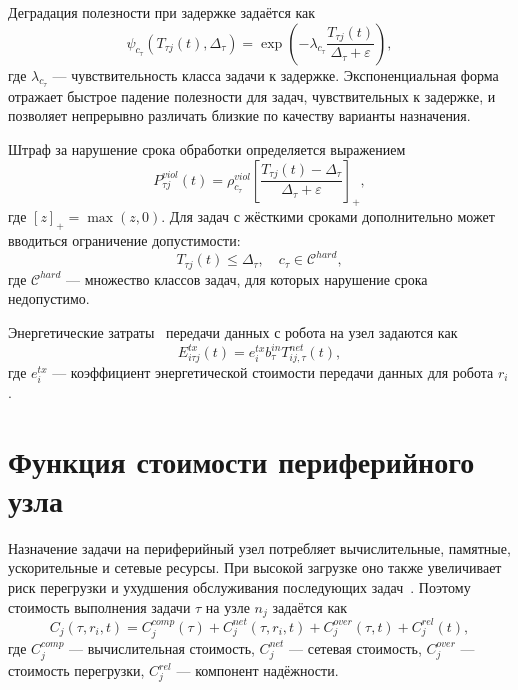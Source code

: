 Деградация полезности при задержке задаётся как
\begin{equation}
    \psi_{c_{\tau}}(T_{\tau j}(t),\Delta_{\tau})=\exp\left(-\lambda_{c_{\tau}}\frac{T_{\tau j}(t)}{\Delta_{\tau}+\varepsilon}\right),
    \label{eq:ch2_delay_degradation}
\end{equation}
где $\lambda_{c_{\tau}}$ --- чувствительность класса задачи к задержке. Экспоненциальная форма отражает быстрое падение полезности для задач, чувствительных к задержке, и позволяет непрерывно различать близкие по качеству варианты назначения.

Штраф за нарушение срока обработки определяется выражением
\begin{equation}
    P^{viol}_{\tau j}(t)=\rho^{viol}_{c_{\tau}}\left[\frac{T_{\tau j}(t)-\Delta_{\tau}}{\Delta_{\tau}+\varepsilon}\right]_+,
    \label{eq:ch2_deadline_penalty}
\end{equation}
где $[z]_+=\max(z,0)$. Для задач с жёсткими сроками дополнительно может вводиться ограничение допустимости:
\begin{equation}
    T_{\tau j}(t)\leq\Delta_{\tau},\quad c_{\tau}\in\mathcal{C}^{hard},
    \label{eq:ch2_hard_deadline}
\end{equation}
где $\mathcal{C}^{hard}$ --- множество классов задач, для которых нарушение срока недопустимо.

Энергетические затраты~\cite{Li2023EdgeEnergy} передачи данных с робота на узел задаются как
\begin{equation}
    E^{tx}_{i\tau j}(t)=e^{tx}_i b^{in}_{\tau} T^{net}_{ij,\tau}(t),
    \label{eq:ch2_energy_cost}
\end{equation}
где $e^{tx}_i$ --- коэффициент энергетической стоимости передачи данных для робота $r_i$.

\section{Функция стоимости периферийного узла}

Назначение задачи на периферийный узел потребляет вычислительные, памятные, ускорительные и сетевые ресурсы. При высокой загрузке оно также увеличивает риск перегрузки и ухудшения обслуживания последующих задач~\cite{Li2024NonConvexFog,Chu2024CooperativeEdgeIncentives,Liu2024TruthfulMechanism}. Поэтому стоимость выполнения задачи $\tau$ на узле $n_j$ задаётся как
\begin{equation}
    C_j(\tau,r_i,t)=C^{comp}_j(\tau)+C^{net}_j(\tau,r_i,t)+C^{over}_j(\tau,t)+C^{rel}_j(t),
    \label{eq:ch2_cost}
\end{equation}
где $C^{comp}_j$ --- вычислительная стоимость, $C^{net}_j$ --- сетевая стоимость, $C^{over}_j$ --- стоимость перегрузки, $C^{rel}_j$ --- компонент надёжности.

